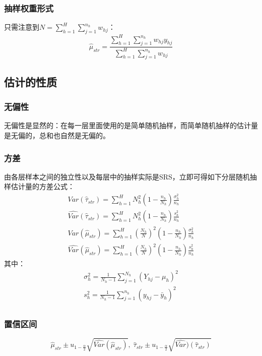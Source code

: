 \subsubsection{抽样权重形式}
只需注意到$N=\sum\limits_{h=1}^H\sum\limits_{j=1}^{n_h}w_{hj}$：
\begin{equation*}
	\hat{\mu}_{str}=\frac{\sum\limits_{h=1}^H\sum\limits_{j=1}^{n_h}w_{hj}y_{hj}}{\sum\limits_{h=1}^H\sum\limits_{j=1}^{n_h}w_{hj}}
\end{equation*}

\subsection{估计的性质}
\subsubsection{无偏性}
无偏性是显然的：在每一层里面使用的是简单随机抽样，而简单随机抽样的估计量是无偏的，总和也自然是无偏的。
\subsubsection{方差}
由各层样本之间的独立性以及每层中的抽样实际是SRS，立即可得如下分层随机抽样估计量的方差公式：
\begin{gather*}
	Var(\hat{\tau}_{str})=\sum_{h=1}^HN_h^2\left(1-\frac{n_h}{N_h}\right)\frac{\sigma_h^2}{n_h} \\
	\widehat{Var}(\hat{\tau}_{str})=\sum_{h=1}^HN_h^2\left(1-\frac{n_h}{N_h}\right)\frac{s_h^2}{n_h} \\
	Var(\hat{\mu}_{str})=\sum_{h=1}^H\left(\frac{N_h}{N}\right)^2\left(1-\frac{n_h}{N_h}\right)\frac{\sigma_h^2}{n_h} \\
	\widehat{Var}(\hat{\mu}_{str})=\sum_{h=1}^H\left(\frac{N_h}{N}\right)^2\left(1-\frac{n_h}{N_h}\right)\frac{s_h^2}{n_h}
\end{gather*}
其中：
\begin{gather*}
	\sigma_h^2=\frac{1}{N_h-1}\sum_{j=1}^{N_h}\left(Y_{hj}-\mu_h\right)^2 \\
	s_h^2=\frac{1}{N_h-1}\sum_{j=1}^{n_h}\left(y_{hj}-\bar{y}_h\right)^2 \\
\end{gather*}

\subsubsection{置信区间}
\begin{equation*}
	\hat{\mu}_{str}\pm u_{1-\frac{\alpha}{2}}\sqrt{\widehat{Var}(\hat{\mu}_{str})},\;\hat{\tau}_{str}\pm u_{1-\frac{\alpha}{2}}\sqrt{\widehat{Var})(\hat{\tau}_{str})}
\end{equation*}
